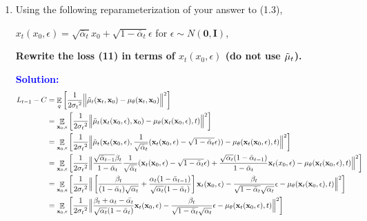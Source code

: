\documentclass{article}
\DeclareMathOperator{\EX}{\mathbb{E}}%
\begin{document}
\begin{enumerate}
    \item 
    Using the following reparameterization of your answer to (1.3), 
    
    ${x_t}(x_0, \epsilon) = \sqrt{\bar\alpha_t}x_0 + \sqrt{1 - \bar\alpha_t}\epsilon $  for $\epsilon \sim N(\boldsymbol{0}, \boldsymbol{I})$, 
    
    \textbf{Rewrite the loss (11) in terms of ${x_t}(x_0, \epsilon)$ (do not use $\Tilde\mu_t$).}

\textcolor{blue}{
    \textbf{Solution: } 
    \begin{align*}
    L_{t-1} - C &= \EX_q\left[\frac{1}{2{\sigma_t}^2}
    \Big\lVert{\Tilde\mu_t}(\textbf{x}_t, \textbf{x}_0) - {\mu_\theta}(\textbf{x}_t, \textbf{x}_0)\Big\rVert^2\right] \\
    &= \EX_{\textbf{x}_0, \epsilon}\left[\frac{1}{2{\sigma_t}^2}
    \Big\lVert{\Tilde\mu_t}(\textbf{x}_t(\textbf{x}_0, \epsilon), \textbf{x}_0) - {\mu_\theta}(\textbf{x}_t(\textbf{x}_0, \epsilon), t)\Big\rVert^2\right] \\
    &= \EX_{\textbf{x}_0, \epsilon}\left[\frac{1}{2{\sigma_t}^2}
    \Big\lVert{\Tilde\mu_t}(\textbf{x}_t(\textbf{x}_0, \epsilon), \frac{1}{\sqrt{\Bar{\alpha}_t}}(\textbf{x}_t(\textbf{x}_0, \epsilon) - \sqrt{1 - \Bar{\alpha}_t}\epsilon)) - {\mu_\theta}(\textbf{x}_t(\textbf{x}_0, \epsilon), t)\Big\lVert^2\right] \\
    &= \EX_{\textbf{x}_0, \epsilon}\left[\frac{1}{2{\sigma_t}^2}
    \Big\lVert \frac{\sqrt{\Bar{\alpha}_{t-1}}\beta_t}{1 - \Bar{\alpha}_t}\frac{1}{\sqrt{\Bar{\alpha}_t}}(\textbf{x}_t(\textbf{x}_0, \epsilon) - \sqrt{1 - \Bar{\alpha}_t}\epsilon) + \frac{\sqrt{\alpha_t}(1 - \Bar{\alpha}_{t-1})}{1 - \Bar{\alpha}_t}\textbf{x}_t(x_0, \epsilon) - {\mu_\theta}(\textbf{x}_t(\textbf{x}_0, \epsilon), t)\Big\rVert^2\right]\\
    &= \EX_{\textbf{x}_0, \epsilon}\left[\frac{1}{2{\sigma_t}^2}
    \Big\lVert \left[\frac{\beta_t}{(1 - \Bar{\alpha}_t)\sqrt{\alpha_t}} + \frac{\alpha_t(1 - \Bar{\alpha}_{t - 1})}{\sqrt{\alpha_t}(1 - \Bar{\alpha}_t)}\right]\textbf{x}_t(\textbf{x}_0, \epsilon) - \frac{\beta_t}{\sqrt{1 - \Bar{\alpha}_t}\sqrt{\alpha_t}}\epsilon - {\mu_\theta}(\textbf{x}_t(\textbf{x}_0, \epsilon), t)\Big\rVert^2\right]\\
    &= \EX_{\textbf{x}_0, \epsilon}\left[\frac{1}{2{\sigma_t}^2}
    \Big\lVert \frac{\beta_t + \alpha_t - \Bar{\alpha_t}}{\sqrt{\alpha_t}(1 - \Bar{\alpha}_t)}\textbf{x}_t(\textbf{x}_0, \epsilon) - \frac{\beta_t}{\sqrt{1 - \Bar{\alpha}_t}\sqrt{\alpha_t}}\epsilon - {\mu_\theta}(\textbf{x}_t(\textbf{x}_0, \epsilon), t)\Big\rVert^2\right]\\

\end{align*}}
\end{enumerate}
\end{document}
